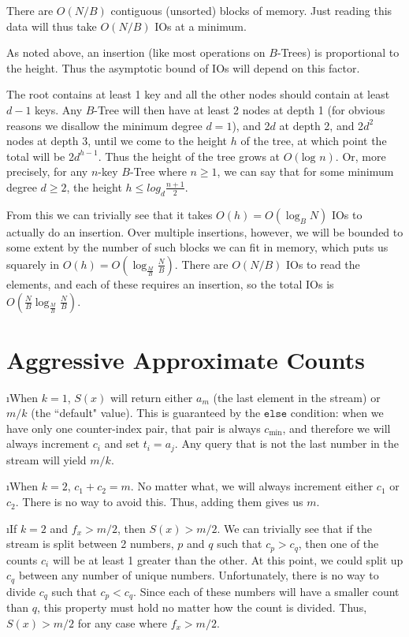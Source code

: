 \documentclass[fleqn]{article}
\begin{document}
There are $O(N/B)$ contiguous (unsorted) blocks of memory. Just reading this data will thus take $O(N/B)$ IOs at a minimum.

As noted above, an insertion (like most operations on $B$-Trees) is proportional to the height. Thus the asymptotic bound of IOs will depend on this factor.

The root contains at least 1 key and all the other nodes should contain at least $d - 1$ keys. Any $B$-Tree will then have at least 2 nodes at depth 1 (for obvious reasons we disallow the minimum degree $d = 1$), and 2$d$ at depth 2, and 2$d^2$ nodes at depth 3, until we come to the height $h$ of the tree, at which point the total will be 2$d^{h-1}$. Thus the height of the tree grows at $O(\mbox{log } n)$. Or, more precisely, for any $n$-key $B$-Tree where $n \ge 1$, we can say that for some minimum degree $d \ge 2$, the height $h \le log_d \frac{n+1}{2}$.

From this we can trivially see that it takes $O(h) = O(\log_B N)$ IOs to actually do an insertion. Over multiple insertions, however, we will be bounded to some extent by the number of such blocks we can fit in memory, which puts us squarely in $O(h) = O(\log_\frac{M}{B} \frac{N}{B})$. There are $O(N/B)$ IOs to read the elements, and each of these requires an insertion, so the total IOs is $O(\frac{N}{B} \log_\frac{M}{B} \frac{N}{B})$.


\section{Aggressive Approximate Counts}

\bee
\i When $k=1$, $S(x)$ will return either $a_m$ (the last element in the stream) or $m/k$ (the ``default" value). This is guaranteed by the $\texttt{else}$ condition: when we have only one counter-index pair, that pair is always $c_{\mbox{min}}$, and therefore we will always increment $c_i$ and set $t_i = a_j$. Any query that is not the last number in the stream will yield $m/k$.

\i When $k=2$, $c_1 + c_2 = m$. No matter what, we will always increment either $c_1$ or $c_2$. There is no way to avoid this. Thus, adding them gives us $m$.

\i If $k=2$ and $f_x > m/2$, then $S(x) > m/2$. We can trivially see that if the stream is split between 2 numbers, $p$ and $q$ such that $c_p > c_q$, then one of the counts $c_i$ will be at least 1 greater than the other. At this point, we could split up $c_q$ between any number of unique numbers. Unfortunately, there is no way to divide $c_q$ such that $c_p < c_q$. Since each of these numbers will have a smaller count than $q$, this property must hold no matter how the count is divided. Thus, $S(x) > m/2$ for any case where $f_x > m/2$.
\end{document}
